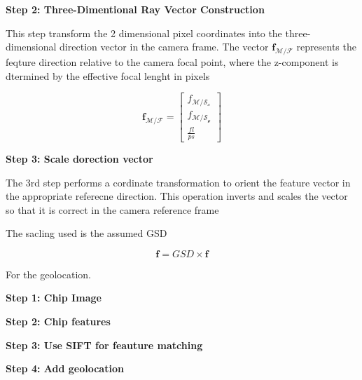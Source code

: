 \textbf{Step 2: Three-Dimentional Ray Vector Construction}

This step transform the 2 dimensional pixel coordinates into the three-dimensional direction vector in the camera frame. The vector $\mathbf{f}_\mathcal{M/F}$ represents
the feqture direction relative to the camera focal point, where the z-component is dtermined by the effective focal lenght in pixels

\begin{equation}
    \mathbf{f}_\mathcal{M/F} = 
    \begin{bmatrix}
        f_{\mathcal{M/S_x}} \\
        f_{\mathcal{M/S_y}} \\
        \frac{fl}{ps}
    \end{bmatrix}
\end{equation}

\textbf{Step 3: Scale dorection vector}

The 3rd step performs a cordinate transformation to orient the feature vector in the appropriate referecne direction. This operation inverts and scales the vector so that it
is correct in the camera reference frame

The sacling used is the assumed GSD

\begin{equation}
    \mathbf{f} = GSD \times \mathbf{f}
\end{equation}


For the geolocation.

\textbf{Step 1: Chip Image}

\textbf{Step 2: Chip features}

\textbf{Step 3: Use SIFT for feauture matching}

\textbf{Step 4: Add geolocation}


